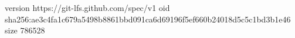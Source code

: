 version https://git-lfs.github.com/spec/v1
oid sha256:ae3c4fa1c679a5498b8861bbd091ca6d69196f5ef660b24018d5c5c1bd3b1e46
size 786528

